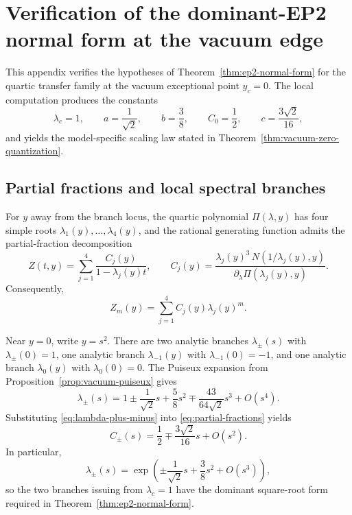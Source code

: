 \section{Verification of the dominant-EP2 normal form at the vacuum edge}\label{app:vacuum-edge}

This appendix verifies the hypotheses of Theorem~\ref{thm:ep2-normal-form} for the quartic transfer family at the vacuum exceptional point $y_c=0$.
The local computation produces the constants
\[
\lambda_c=1,\qquad
a=\frac{1}{\sqrt2},\qquad
b=\frac38,\qquad
C_0=\frac12,\qquad
c=\frac{3\sqrt2}{16},
\]
and yields the model-specific scaling law stated in Theorem~\ref{thm:vacuum-zero-quantization}.

\subsection{Partial fractions and local spectral branches}

For $y$ away from the branch locus, the quartic polynomial $\Pi(\lambda,y)$ has four simple roots $\lambda_1(y),\dots,\lambda_4(y)$, and the rational generating function admits the partial-fraction decomposition
\begin{equation}\label{eq:partial-fractions}
Z(t,y)=\sum_{j=1}^4 \frac{C_j(y)}{1-\lambda_j(y)t},
\qquad
C_j(y)=\frac{\lambda_j(y)^3\,N(1/\lambda_j(y),y)}{\partial_\lambda\Pi(\lambda_j(y),y)}.
\end{equation}
Consequently,
\begin{equation}\label{eq:spectral-decomposition}
Z_m(y)=\sum_{j=1}^4 C_j(y)\lambda_j(y)^m.
\end{equation}

Near $y=0$, write $y=s^2$.
There are two analytic branches $\lambda_\pm(s)$ with $\lambda_\pm(0)=1$, one analytic branch $\lambda_{-1}(y)$ with $\lambda_{-1}(0)=-1$, and one analytic branch $\lambda_0(y)$ with $\lambda_0(0)=0$.
The Puiseux expansion from Proposition~\ref{prop:vacuum-puiseux} gives
\begin{equation}\label{eq:lambda-plus-minus}
\lambda_\pm(s)
=
1\pm \frac{1}{\sqrt2}s+\frac58 s^2 \mp \frac{43}{64\sqrt2}s^3+O(s^4).
\end{equation}
Substituting \eqref{eq:lambda-plus-minus} into \eqref{eq:partial-fractions} yields
\begin{equation}\label{eq:C-plus-minus}
C_\pm(s)
=
\frac12\mp \frac{3\sqrt2}{16}s+O(s^2).
\end{equation}
In particular,
\[
\lambda_\pm(s)
=
\exp\!\left(\pm \frac{1}{\sqrt2}s+\frac38 s^2+O(s^3)\right),
\]
so the two branches issuing from $\lambda_c=1$ have the dominant square-root form required in Theorem~\ref{thm:ep2-normal-form}.

